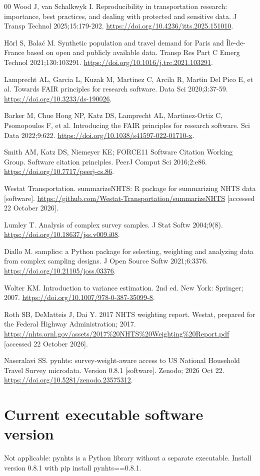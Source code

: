 \documentclass[preprint,12pt, a4paper]{elsarticle}
\begin{document}
\begin{thebibliography}{00}
 Wood J, van Schalkwyk I. Reproducibility in transportation research: importance, best practices, and dealing with protected and sensitive data. J Transp Technol 2025;15:179-202. \url{https://doi.org/10.4236/jtts.2025.151010}.

 H\"orl S, Bala\'c M. Synthetic population and travel demand for Paris and \^Ile-de-France based on open and publicly available data. Transp Res Part C Emerg Technol 2021;130:103291. \url{https://doi.org/10.1016/j.trc.2021.103291}.

 Lamprecht AL, Garcia L, Kuzak M, Martinez C, Arcila R, Martin Del Pico E, et al. Towards FAIR principles for research software. Data Sci 2020;3:37-59. \url{https://doi.org/10.3233/ds-190026}.

 Barker M, Chue Hong NP, Katz DS, Lamprecht AL, Martinez-Ortiz C, Psomopoulos F, et al. Introducing the FAIR principles for research software. Sci Data 2022;9:622. \url{https://doi.org/10.1038/s41597-022-01710-x}.

 Smith AM, Katz DS, Niemeyer KE; FORCE11 Software Citation Working Group. Software citation principles. PeerJ Comput Sci 2016;2:e86. \url{https://doi.org/10.7717/peerj-cs.86}.

 Westat Transportation. summarizeNHTS: R package for summarizing NHTS data [software]. \url{https://github.com/Westat-Transportation/summarizeNHTS} [accessed 22 October 2026].

 Lumley T. Analysis of complex survey samples. J Stat Softw 2004;9(8). \url{https://doi.org/10.18637/jss.v009.i08}.

 Diallo M. samplics: a Python package for selecting, weighting and analyzing data from complex sampling designs. J Open Source Softw 2021;6:3376. \url{https://doi.org/10.21105/joss.03376}.

 Wolter KM. Introduction to variance estimation. 2nd ed. New York: Springer; 2007. \url{https://doi.org/10.1007/978-0-387-35099-8}.

 Roth SB, DeMatteis J, Dai Y. 2017 NHTS weighting report. Westat, prepared for the Federal Highway Administration; 2017. \url{https://nhts.ornl.gov/assets/2017\%20NHTS\%20Weighting\%20Report.pdf} [accessed 22 October 2026].

 Naseralavi SS. pynhts: survey-weight-aware access to US National Household Travel Survey microdata. Version 0.8.1 [software]. Zenodo; 2026 Oct 22. \url{https://doi.org/10.5281/zenodo.23575312}.

\end{thebibliography}

\section*{Current executable software version}

Not applicable: pynhts is a Python library without a separate executable. Install version 0.8.1 with pip install pynhts==0.8.1.
\end{document}
